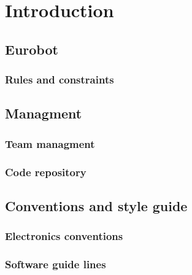 \chapter{Introduction}



\section{Eurobot}

\subsection{Rules and constraints}

\section{Managment}

\subsection{Team managment}

\subsection{Code repository}

\section{Conventions and style guide}

\subsection{Electronics conventions}

\subsection{Software guide lines}

